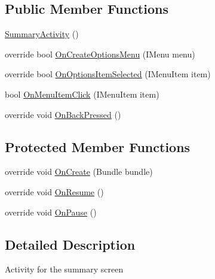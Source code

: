 \subsection*{Public Member Functions}
\begin{DoxyCompactItemize}
\item 
\hyperlink{class_field_service_1_1_android_1_1_summary_activity_a485642bd367dd6feae2be4efe0895ff8}{Summary\+Activity} ()
\item 
override bool \hyperlink{class_field_service_1_1_android_1_1_summary_activity_a0593f4ea44270b34a0da23ae4c6189be}{On\+Create\+Options\+Menu} (I\+Menu menu)
\item 
override bool \hyperlink{class_field_service_1_1_android_1_1_summary_activity_abe70f4cce47beea24fe0af1627a70ca4}{On\+Options\+Item\+Selected} (I\+Menu\+Item item)
\item 
bool \hyperlink{class_field_service_1_1_android_1_1_summary_activity_a31afcc6446636920470f0bfd5cc953de}{On\+Menu\+Item\+Click} (I\+Menu\+Item item)
\item 
override void \hyperlink{class_field_service_1_1_android_1_1_summary_activity_a9f24a9495663d6302a578eb9028a0af3}{On\+Back\+Pressed} ()
\end{DoxyCompactItemize}
\subsection*{Protected Member Functions}
\begin{DoxyCompactItemize}
\item 
override void \hyperlink{class_field_service_1_1_android_1_1_summary_activity_a0adc06f013514c1344d1849d2a35fbde}{On\+Create} (Bundle bundle)
\item 
override void \hyperlink{class_field_service_1_1_android_1_1_summary_activity_a3916f4d5416aeb269eef463d4dc6291c}{On\+Resume} ()
\item 
override void \hyperlink{class_field_service_1_1_android_1_1_summary_activity_ad70b9588b04260c4829c54f00507a888}{On\+Pause} ()
\end{DoxyCompactItemize}


\subsection{Detailed Description}
Activity for the summary screen 



